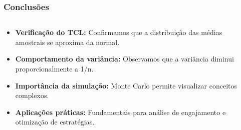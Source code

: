\documentclass[aspectratio=169,12pt]{beamer}
\begin{document}
\begin{frame}
    \frametitle{Conclusões}
    
    \begin{columns}
        \begin{column}{0.55\textwidth}
            \begin{itemize}
                \item[\faIcon{check-circle}] \textcolor{azulprincipal}{\textbf{Verificação do TCL:}} Confirmamos que a distribuição das médias amostrais se aproxima da normal.
                \vspace{0.3cm}
                
                \item[\faIcon{chart-line}] \textcolor{azulprincipal}{\textbf{Comportamento da variância:}} Observamos que a variância diminui proporcionalmente a 1/n.
                \vspace{0.3cm}
                
                \item[\faIcon{lightbulb}] \textcolor{azulprincipal}{\textbf{Importância da simulação:}} Monte Carlo permite visualizar conceitos complexos.
                \vspace{0.3cm}
                
                \item[\faIcon{briefcase}] \textcolor{azulprincipal}{\textbf{Aplicações práticas:}} Fundamentais para análise de engajamento e otimização de estratégias.
            \end{itemize}
        \end{column}
        
        \begin{column}{0.45\textwidth}
            \begin{center}
\end{center}
\end{column}
\end{columns}
\end{frame}
\end{document}
